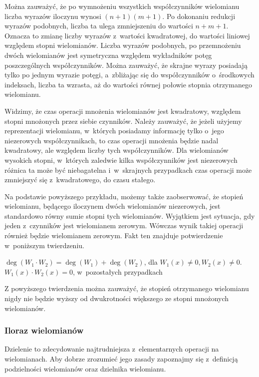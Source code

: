 Można zauważyć, że po wymnożeniu wszystkich współczynników wielomianu liczba wyrazów iloczynu wynosi $(n+1)(m+1)$. Po dokonaniu redukcji wyrazów podobnych, liczba ta ulega zmniejszeniu do wartości $n+m+1$. Oznacza to zmianę liczby wyrazów z~wartości kwadratowej, do wartości liniowej względem stopni wielomianów. Liczba wyrazów podobnych, po przemnożeniu dwóch wielomianów jest symetryczna względem wykładników potęg poszczególnych współczynników. Można zauważyć, że skrajne wyrazy posiadają tylko po jednym wyrazie potęgi, a~zbliżając się do współczynników o~środkowych indeksach, liczba ta wzrasta, aż do wartości równej połowie stopnia otrzymanego wielomianu.

Widzimy, że czas operacji mnożenia wielomianów jest kwadratowy, względem stopni mnożonych przez siebie czynników. Należy zauważyć, że jeżeli użyjemy reprezentacji wielomianu, w~których posiadamy informację tylko o~jego niezerowych współczynnikach, to czas operacji mnożenia będzie nadal kwadratowy, ale względem liczby tych współczynników. Dla wielomianów wysokich stopni, w~których zaledwie kilka współczynników jest niezerowych różnica ta może być niebagatelna i~w~skrajnych przypadkach czas operacji może zmniejszyć się z~kwadratowego, do czasu stałego.

Na podstawie powyższego przykładu, możemy także zaobserwować, że stopień wielomianu, będącego iloczynem dwóch wielomianów niezerowych, jest standardowo równy sumie stopni tych wielomianów. Wyjątkiem jest sytuacja, gdy jeden z~czynników jest wielomianem zerowym. Wówczas wynik takiej operacji również będzie wielomianem zerowym. Fakt ten znajduje potwierdzenie w~poniższym twierdzeniu.

\begin{theorem}
	$ $\\
	$\deg(W_1 \cdot W_2) = \deg(W_1) + \deg(W_2)$, dla $W_1(x) \neq 0, W_2(x) \neq 0$. $W_1(x) \cdot W_2(x) = 0$, w~pozostałych przypadkach
\end{theorem}

Z powyższego twierdzenia można zauważyć, że stopień otrzymanego wielomianu nigdy nie będzie wyższy od dwukrotności większego ze stopni mnożonych wielomianów.

\subsubsection{Iloraz wielomianów}

Dzielenie to zdecydowanie najtrudniejsza z~elementarnych operacji na wielomianach. Aby dobrze zrozumieć jego zasady zapoznajmy się z~definicją podzielności wielomianów oraz dzielnika wielomianu.

